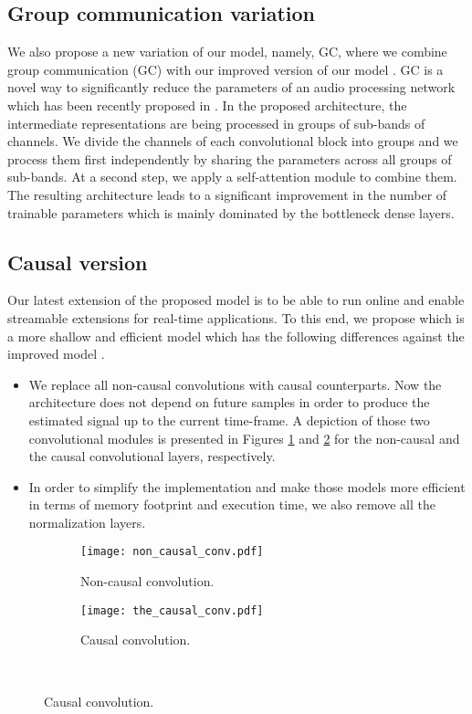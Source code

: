 \subsection{Group communication variation}
\label{sec:net_arch:sudoigc}
We also propose a new variation of our model, namely, \sudoi GC, where we combine group communication (GC) with our improved version of our model \sudodoti. GC is a novel way to significantly reduce the parameters of an audio processing network which has been recently proposed in \cite{luo2020groupcomm}. In the proposed architecture, the intermediate representations are being processed in groups of sub-bands of channels. We divide the channels of each  convolutional block into  groups and we process them first independently by sharing the parameters across all groups of sub-bands. At a second step, we apply a self-attention module \cite{shaw2018selfattention} to combine them. The resulting architecture leads to a significant improvement in the number of trainable parameters which is mainly dominated by the bottleneck dense layers.

\subsection{Causal version \csudoi}
\label{sec:net_arch:csudoi}

Our latest extension of the proposed model is to be able to run online and enable streamable extensions for real-time applications. To this end, we propose \csudoi which is a more shallow and efficient model which has the following differences against the improved model \sudoi.
\begin{itemize}
    \item We replace all non-causal convolutions with causal counterparts. Now the architecture does not depend on future samples in order to produce the estimated signal up to the current time-frame. A depiction of those two convolutional modules is presented in Figures \ref{fig:noncausalconv} and \ref{fig:causalconv} for the non-causal and the causal convolutional layers, respectively.
    \item In order to simplify the implementation and make those models more efficient in terms of memory footprint and execution time, we also remove all the normalization layers.
\end{itemize}

\begin{figure}[!htb]
    \centering
  \begin{subfigure}[h]{0.49\linewidth}
      \texttt{[image: non\_causal\_conv.pdf]}
      \caption{Non-causal convolution.}
      \label{fig:noncausalconv} 
     \end{subfigure}
  \begin{subfigure}[h]{0.47\linewidth}
      \texttt{[image: the\_causal\_conv.pdf]}  
      \caption{Causal convolution.}
      \label{fig:causalconv} 
     \end{subfigure} \\
    \label{fig:convolutions}
\end{figure} 

